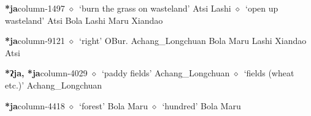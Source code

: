   \item {\footnotesize \textbf{*ja}}{\tiny column-1497}
         $\diamond$~`burn the grass on wasteland'
         Atsi 
\hspace{1ex}
         Lashi 
\hspace{1ex}
         $\diamond$~`open up wasteland'
         Atsi 
\hspace{1ex}
         Bola 
\hspace{1ex}
         Lashi 
\hspace{1ex}
         Maru 
\hspace{1ex}
         Xiandao 
  \item {\footnotesize \textbf{*ja}}{\tiny column-9121}
         $\diamond$~`right'
         OBur. 
\hspace{1ex}
         Achang\_Longchuan 
\hspace{1ex}
         Bola 
\hspace{1ex}
         Maru 
\hspace{1ex}
         Lashi 
\hspace{1ex}
         Xiandao 
\hspace{1ex}
         Atsi 
  \item {\footnotesize \textbf{*ʔja, *ja}}{\tiny column-4029}
         $\diamond$~`paddy fields'
         Achang\_Longchuan 
\hspace{1ex}
         $\diamond$~`fields (wheat etc.)'
         Achang\_Longchuan 
  \item {\footnotesize \textbf{*ja}}{\tiny column-4418}
         $\diamond$~`forest'
         Bola 
\hspace{1ex}
         Maru 
\hspace{1ex}
         $\diamond$~`hundred'
         Bola 
\hspace{1ex}
         Maru 
\hspace{1ex}
